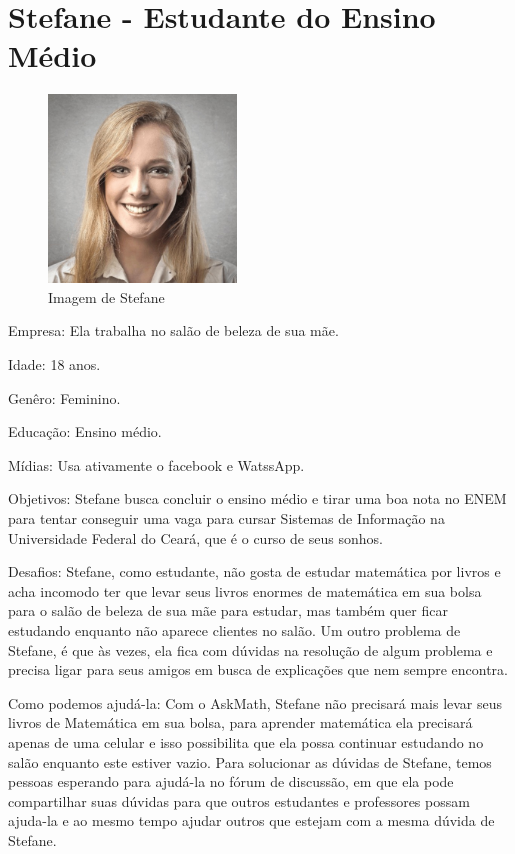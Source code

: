 \section{Stefane - Estudante do Ensino Médio}

\begin{figure}[H]
\centering
\caption{Imagem de Stefane}
\includegraphics[width=5cm]{figuras/personas/figura_persona_4}

\label{figura_persona_4}
\end{figure}

Empresa: Ela trabalha no salão de beleza de sua mãe.

Idade: 18 anos.

Genêro: Feminino.

Educação: Ensino médio.

Mídias: Usa ativamente o facebook e WatssApp.

Objetivos: Stefane busca concluir o ensino médio e tirar uma boa nota no ENEM 
para tentar conseguir uma vaga para cursar Sistemas de Informação na Universidade Federal do Cear\'a, que é 
o curso de seus sonhos.

Desafios: Stefane, como estudante, não gosta de estudar matemática por livros e acha incomodo ter que levar seus livros enormes de matemática em sua bolsa para o salão de beleza de sua mãe para 
estudar, mas tamb\'em quer ficar estudando enquanto não aparece clientes no salão. Um outro problema de Stefane, é que às vezes, ela fica com dúvidas na resolução de algum problema e precisa ligar 
para seus amigos em busca de explicações que nem sempre encontra.

Como podemos ajudá-la: Com o AskMath, Stefane não precisará mais levar seus livros de Matemática em sua bolsa, para aprender matemática ela precisar\'a apenas de uma celular e isso possibilita que 
ela possa continuar estudando no salão enquanto este estiver vazio. Para solucionar as dúvidas de Stefane, 
temos pessoas esperando para ajudá-la no f\'orum de discuss\~ao, em que ela pode compartilhar suas d\'uvidas para que outros estudantes e professores possam ajuda-la e ao mesmo tempo ajudar outros 
que estejam com a mesma d\'uvida de Stefane. 